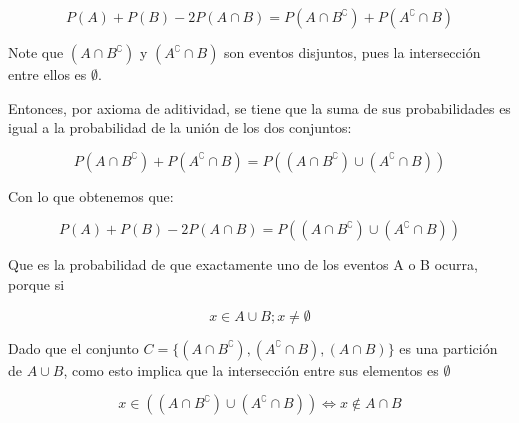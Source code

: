 \documentclass{homeworg}
\begin{document}
\[P(A) + P(B) - 2P(A \cap B) = P(A \cap B^\complement) + P(A^\complement \cap B)\]

Note que $(A \cap B^\complement)$ y $(A^\complement \cap B)$ son eventos disjuntos, pues la intersección entre ellos es $\emptyset$.

Entonces, por axioma de aditividad, se tiene que la suma de sus probabilidades es igual a la probabilidad de la unión de los dos conjuntos:

\[P(A \cap B^\complement) + P(A^\complement \cap B) = P((A \cap B^\complement) \cup (A^\complement \cap B))\]

Con lo que obtenemos que:

\[P(A) + P(B) - 2P(A \cap B) = P((A \cap B^\complement) \cup (A^\complement \cap B))\]

Que es la probabilidad de que exactamente uno de los eventos A o B ocurra, porque si 

\[x \in A \cup B ; x \neq \emptyset \]

Dado que el conjunto $C = \{(A \cap B^\complement), (A^\complement \cap B), (A \cap B)\}$ es una partición de $A \cup B$, como esto implica que la intersección entre sus elementos es $\emptyset$

\[x \in ( (A \cap B^\complement) \cup (A^\complement \cap B) ) \iff x \notin A \cap B \]




\setlength\parindent{400pt}\scalebox{0.8}{$\square$}
\end{document}
